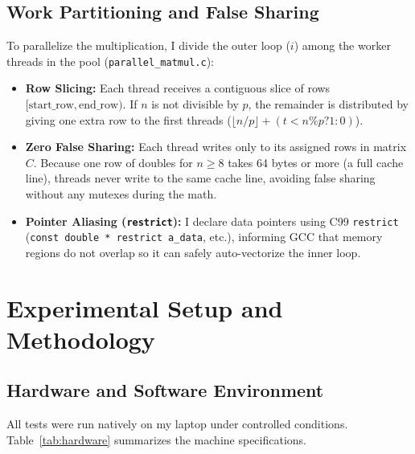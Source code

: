 \documentclass[11pt,a4paper]{article}
\begin{document}
\subsection{Work Partitioning and False Sharing}
To parallelize the multiplication, I divide the outer loop ($i$) among the worker threads in the pool (\texttt{parallel\_matmul.c}):
\begin{itemize}
    \item \textbf{Row Slicing:} Each thread receives a contiguous slice of rows $[\text{start\_row}, \text{end\_row})$. If $n$ is not divisible by $p$, the remainder is distributed by giving one extra row to the first threads ($\lfloor n / p \rfloor + (t < n\%p ? 1 : 0)$).
    \item \textbf{Zero False Sharing:} Each thread writes only to its assigned rows in matrix $C$. Because one row of doubles for $n \ge 8$ takes 64 bytes or more (a full cache line), threads never write to the same cache line, avoiding false sharing without any mutexes during the math.
    \item \textbf{Pointer Aliasing (\texttt{restrict}):} I declare data pointers using C99 \texttt{restrict} (\texttt{const double * restrict a\_data}, etc.), informing GCC that memory regions do not overlap so it can safely auto-vectorize the inner loop.
\end{itemize}

\section{Experimental Setup and Methodology}

\subsection{Hardware and Software Environment}
All tests were run natively on my laptop under controlled conditions. Table~\ref{tab:hardware} summarizes the machine specifications.
\end{document}

